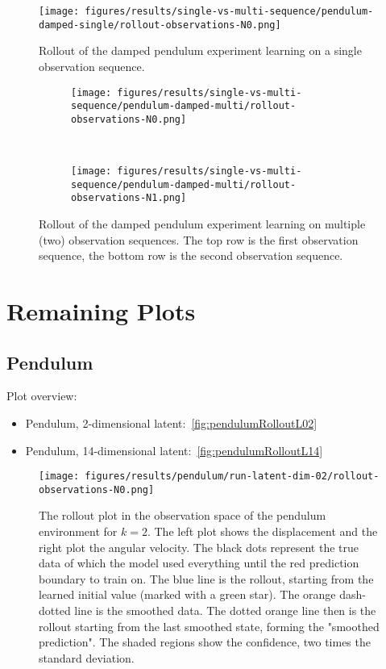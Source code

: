 	\begin{figure}
		\centering
		\texttt{[image: figures/results/single-vs-multi-sequence/pendulum-damped-single/rollout-observations-N0.png]}
		\caption[Rollout of the damped pendulum experiment learning on a single observation sequence]{Rollout of the damped pendulum experiment learning on a single observation sequence.}
		\label{fig:plotsSingleSequence}
	\end{figure}
	\begin{figure}
		\centering
		\begin{subfigure}{\linewidth}
			\texttt{[image: figures/results/single-vs-multi-sequence/pendulum-damped-multi/rollout-observations-N0.png]}
		\end{subfigure} \\
		\begin{subfigure}{\linewidth}
			\texttt{[image: figures/results/single-vs-multi-sequence/pendulum-damped-multi/rollout-observations-N1.png]}
		\end{subfigure}
		\caption[Rollout of the damped pendulum experiment learning on two observation sequences]{Rollout of the damped pendulum experiment learning on multiple (two) observation sequences. The top row is the first observation sequence, the bottom row is the second observation sequence.}
		\label{fig:plotsMultiSequence}
	\end{figure}

\section{Remaining Plots}
	\label{app:remainingPlots}

	\subsection{Pendulum}
		Plot overview:
		\begin{itemize}
			\item Pendulum, 2-dimensional latent:~\autoref{fig:pendulumRolloutL02}
			\item Pendulum, 14-dimensional latent:~\autoref{fig:pendulumRolloutL14}
		\end{itemize}

		\begin{figure}
			\centering
			\texttt{[image: figures/results/pendulum/run-latent-dim-02/rollout-observations-N0.png]}
			\caption[Rollout of the pendulum experiment for 2 latent dimensions]{The rollout plot in the observation space of the pendulum environment for \(k = 2\). The left plot shows the displacement and the right plot the angular velocity. The black dots represent the true data of which the model used everything until the red prediction boundary to train on. The blue line is the rollout, starting from the learned initial value (marked with a green star). The orange dash-dotted line is the smoothed data. The dotted orange line then is the rollout starting from the last smoothed state, forming the "smoothed prediction". The shaded regions show the confidence, \ie two times the standard deviation.}
			\label{fig:pendulumRolloutL02}
		\end{figure}

